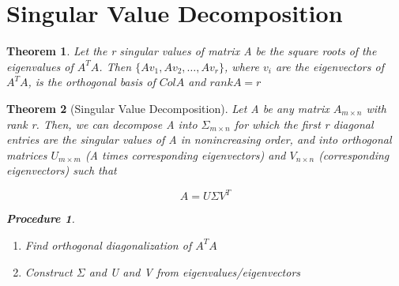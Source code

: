 \documentclass[12pt]{report}
\newtheorem{thm}{Theorem}
\newtheorem{proc}{Procedure}
\newcommand{\mtx}[3]{$#1_{#2\times #3}$}
\begin{document}
\section{Singular Value Decomposition}

\begin{thm}
Let the r singular values of matrix A be the square roots of the eigenvalues of $A^TA$. Then $\{Av_1, Av_2, \ldots, Av_r\}$, where $v_i$ are the eigenvectors of $A^TA$, is the orthogonal basis of $Col A$ and $rank A = r$
\end{thm}

\begin{thm}[Singular Value Decomposition]
Let A be any matrix \mtx{A}{m}{n} with rank r. Then, we can decompose A into \mtx{\Sigma}{m}{n} for which the first r diagonal entries are the singular values of A in nonincreasing order, and into orthogonal matrices \mtx{U}{m}{m} (A times corresponding eigenvectors) and \mtx{V}{n}{n} (corresponding eigenvectors) such that

\begin{equation}
A=U\Sigma V^T
\end{equation}

\begin{proc}
\begin{enumerate}
\item Find orthogonal diagonalization of $A^TA$
\item Construct $\Sigma$ and U and V from eigenvalues/eigenvectors
\end{enumerate}
\end{proc}

\end{thm}
\end{document}
